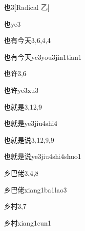 \begin{entry}{也}{3}[Radical 乙]
  \begin{phonetics}{也}{ye3}
  \end{phonetics}
\end{entry}

\begin{entry}{也有今天}{3,6,4,4}
  \begin{phonetics}{也有今天}{ye3you3jin1tian1}
  \end{phonetics}
\end{entry}

\begin{entry}{也许}{3,6}
  \begin{phonetics}{也许}{ye3xu3}
  \end{phonetics}
\end{entry}

\begin{entry}{也就是}{3,12,9}
  \begin{phonetics}{也就是}{ye3jiu4shi4}
  \end{phonetics}
\end{entry}

\begin{entry}{也就是说}{3,12,9,9}
  \begin{phonetics}{也就是说}{ye3jiu4shi4shuo1}
  \end{phonetics}
\end{entry}

\begin{entry}{乡巴佬}{3,4,8}
  \begin{phonetics}{乡巴佬}{xiang1ba1lao3}
  \end{phonetics}
\end{entry}

\begin{entry}{乡村}{3,7}
  \begin{phonetics}{乡村}{xiang1cun1}
  \end{phonetics}
\end{entry}

